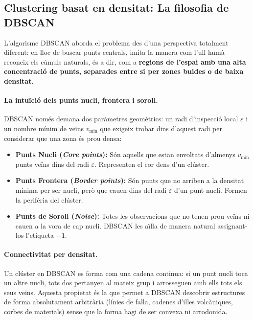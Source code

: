 \documentclass[a4paper,11pt]{article}
\begin{document}
\subsection{Clustering basat en densitat: La filosofia de DBSCAN}

L'algorisme DBSCAN \cite{ester1996, schubert2017} aborda el problema des d'una perspectiva totalment diferent: en lloc de buscar punts centrals, imita la manera com l'ull humà reconeix els cúmuls naturals, és a dir, com a \textbf{regions de l'espai amb una alta concentració de punts, separades entre si per zones buides o de baixa densitat}.

\paragraph{La intuïció dels punts nucli, frontera i soroll.} DBSCAN només demana dos paràmetres geomètrics: un radi d'inspecció local $\varepsilon$ i un nombre mínim de veïns $v_{\min}$ que exigeix trobar dins d'aquest radi per considerar que una zona és prou densa:
\begin{itemize}
    \item \textbf{Punts Nucli (\emph{Core points}):} Són aquells que estan envoltats d'almenys $v_{\min}$ punts veïns dins del radi $\varepsilon$. Representen el cor dens d'un clúster.
    \item \textbf{Punts Frontera (\emph{Border points}):} Són punts que no arriben a la densitat mínima per ser nucli, però que cauen dins del radi $\varepsilon$ d'un punt nucli. Formen la perifèria del clúster.
    \item \textbf{Punts de Soroll (\emph{Noise}):} Totes les observacions que no tenen prou veïns ni cauen a la vora de cap nucli. DBSCAN les aïlla de manera natural assignant-los l'etiqueta $-1$.
\end{itemize}

\paragraph{Connectivitat per densitat.} Un clúster en DBSCAN es forma com una cadena continua: si un punt nucli toca un altre nucli, tots dos pertanyen al mateix grup i arrosseguen amb ells tots els seus veïns. Aquesta propietat és la que permet a DBSCAN descobrir estructures de forma absolutament arbitrària (línies de falla, cadenes d'illes volcàniques, corbes de materials) sense que la forma hagi de ser convexa ni arrodonida.
\end{document}
